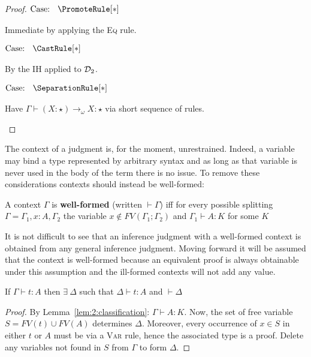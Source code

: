 \begin{proof}
    $\text{Case: }\begin{array}{c} \PromoteRule[*] \end{array}$
    \begin{proofcase}
        Immediate by applying the \textsc{Eq} rule.
    \end{proofcase}

    $\text{Case: }\begin{array}{c} \CastRule[*] \end{array}$
    \begin{proofcase}
        By the IH applied to $\mathcal{D}_{2}$.
    \end{proofcase}

    $\text{Case: }\begin{array}{c} \SeparationRule[*] \end{array}$
    \begin{proofcase}
        Have $\Gamma \vdash (X : \star) \to_\omega X : \star$ via short sequence of rules.
    \end{proofcase}
\end{proof}

The context of a judgment is, for the moment, unrestrained.
Indeed, a variable may bind a type represented by arbitrary syntax and as long as that variable is never used in the body of the term there is no issue.
To remove these considerations contexts should instead be well-formed:
\begin{definition}
    A context $\Gamma$ is \textbf{well-formed} (written $\vdash \Gamma$) iff for every possible splitting $\Gamma = \Gamma_1, x : A, \Gamma_2$ the variable $x \notin FV(\Gamma_1;\Gamma_2)$ and $\Gamma_1 \vdash A : K$ for some $K$
\end{definition}
It is not difficult to see that an inference judgment with a well-formed context is obtained from any general inference judgment.
Moving forward it will be assumed that the context is well-formed because an equivalent proof is always obtainable under this assumption and the ill-formed contexts will not add any value.
\begin{lemma}
    If $\Gamma \vdash t : A$ then $\exists\ \Delta$ such that $\Delta \vdash t : A$ and $\vdash \Delta$
\end{lemma}
\begin{proof}
    By Lemma~\ref{lem:2:classification}: $\Gamma \vdash A : K$.
    Now, the set of free variable $S = FV(t) \cup FV(A)$ determines $\Delta$.
    Moreover, every occurrence of $x \in S$ in either $t$ or $A$ must be via a \textsc{Var} rule, hence the associated type is a proof.
    Delete any variables not found in $S$ from $\Gamma$ to form $\Delta$.
\end{proof}
